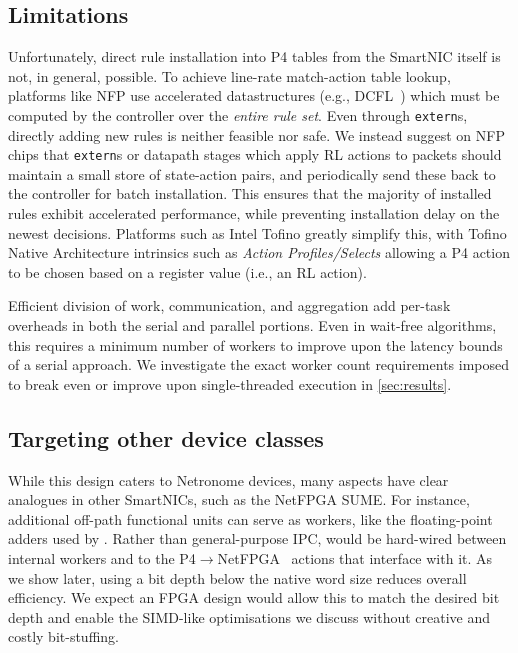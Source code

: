 \subsection{Limitations}\label{sec:limitations}
Unfortunately, direct rule installation into P4 tables from the SmartNIC itself is not, in general, possible.
To achieve line-rate match-action table lookup, platforms like NFP use accelerated datastructures (e.g., DCFL~\parencite{DBLP:conf/infocom/TaylorT05}) which must be computed by the controller over the \emph{entire rule set}.
Even through \texttt{extern}s, directly adding new rules is neither feasible nor safe.
We instead suggest on NFP chips that \texttt{extern}s or datapath stages which apply RL actions to packets should maintain a small store of state-action pairs, and periodically send these back to the controller for batch installation.
This ensures that the majority of installed rules exhibit accelerated performance, while preventing installation delay on the newest decisions.
Platforms such as Intel Tofino greatly simplify this, with Tofino Native Architecture intrinsics such as \emph{Action Profiles/Selects} allowing a P4 action to be chosen based on a register value (i.e., an RL action).

Efficient division of work, communication, and aggregation add per-task overheads in both the serial and parallel portions.
Even in wait-free algorithms, this requires a minimum number of workers to improve upon the latency bounds of a serial approach.
We investigate the exact worker count requirements imposed to break even or improve upon single-threaded execution in \cref{sec:results}.

\subsection{Targeting other device classes}
While this design caters to Netronome devices, many aspects have clear analogues in other SmartNICs, such as the NetFPGA SUME.
For instance, additional off-path functional units can serve as workers, like the floating-point adders used by \textcite{DBLP:conf/isca/LiLYCSH19}.
Rather than general-purpose IPC, \approachshort{} would be hard-wired between internal workers and to the P4$\rightarrow$NetFPGA~\parencite{DBLP:conf/fpga/IbanezBMZ19} actions that interface with it.
As we show later, using a bit depth below the native word size reduces overall efficiency.
We expect an FPGA design would allow this to match the desired bit depth and enable the SIMD-like optimisations we discuss without creative and costly bit-stuffing.

